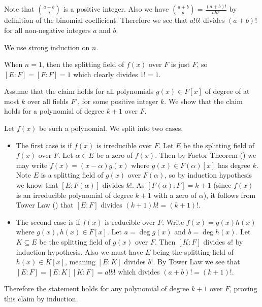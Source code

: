 \begin{questions}
    \item \begin{partquestions}{\roman*}
        \item Note that ${a+b\choose a}$ is a positive integer. Also we have ${a+b\choose a} = \frac{(a+b)!}{a!b!}$ by definition of the binomial coefficient. Therefore we see that $a!b!$ divides $(a+b)!$ for all non-negative integers $a$ and $b$.

        \item We use strong induction on $n$.

        When $n = 1$, then the splitting field of $f(x)$ over $F$ is just $F$, so $[E:F] = [F:F] = 1$ which clearly divides $1! = 1$.

        Assume that the claim holds for all polynomials $g(x) \in F[x]$ of degree of at most $k$ over all fields $F'$, for some positive integer $k$. We show that the claim holds for a polynomial of degree $k+1$ over $F$.

        Let $f(x)$ be such a polynomial. We split into two cases.
        \begin{itemize}
            \item The first case is if $f(x)$ is irreducible over $F$. Let $E$ be the splitting field of $f(x)$ over $F$. Let $\alpha \in E$ be a zero of $f(x)$. Then by Factor Theorem () we may write $f(x) = (x-\alpha)g(x)$ where $g(x) \in F(\alpha)[x]$ has degree $k$. Note $E$ is a splitting field of $g(x)$ over $F(\alpha)$, so by induction hypothesis we know that $[E:F(\alpha)]$ divides $k!$. As $[F(\alpha):F] = k+1$ (since $f(x)$ is an irreducible polynomial of degree $k+1$ with a zero of $\alpha$), it follows from Tower Law () that $[E:F]$ divides $(k+1)k! = (k+1)!$.

            \item The second case is if $f(x)$ is reducible over $F$. Write $f(x) = g(x)h(x)$ where $g(x), h(x) \in F[x]$. Let $a = \deg g(x)$ and $b = \deg h(x)$. Let $K \subseteq E$ be the splitting field of $g(x)$ over $F$. Then $[K:F]$ divides $a!$ by induction hypothesis. Also we must have $E$ being the splitting field of $h(x) \in K[x]$, meaning $[E:K]$ divides $b!$. By Tower Law we see that $[E:F] = [E:K][K:F] = a!b!$ which divides $(a+b)! = (k+1)!$.
        \end{itemize}
        Therefore the statement holds for any polynomial of degree $k+1$ over $F$, proving this claim by induction.
    \end{partquestions}
\end{questions}

